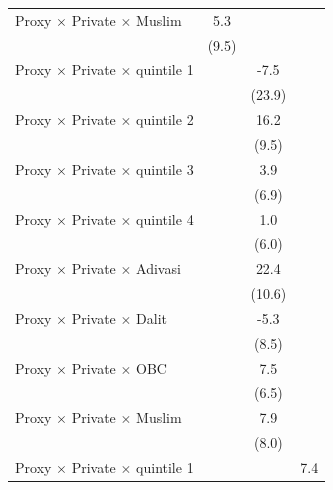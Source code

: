 {\begin{tabular}{l*{3}{c}}
Proxy $\times$ Private $\times$ Muslim&         5.3         &                     &                     \\
            &       (9.5)         &                     &                     \\
\addlinespace
Proxy $\times$ Private $\times$ quintile 1&                     &        -7.5         &                     \\
            &                     &      (23.9)         &                     \\
\addlinespace
Proxy $\times$ Private $\times$ quintile 2&                     &        16.2\sym{*}  &                     \\
            &                     &       (9.5)         &                     \\
\addlinespace
Proxy $\times$ Private $\times$ quintile 3&                     &         3.9         &                     \\
            &                     &       (6.9)         &                     \\
\addlinespace
Proxy $\times$ Private $\times$ quintile 4&                     &         1.0         &                     \\
            &                     &       (6.0)         &                     \\
\addlinespace
Proxy $\times$ Private $\times$ Adivasi&                     &        22.4\sym{**} &                     \\
            &                     &      (10.6)         &                     \\
\addlinespace
Proxy $\times$ Private $\times$ Dalit&                     &        -5.3         &                     \\
            &                     &       (8.5)         &                     \\
\addlinespace
Proxy $\times$ Private $\times$ OBC&                     &         7.5         &                     \\
            &                     &       (6.5)         &                     \\
\addlinespace
Proxy $\times$ Private $\times$ Muslim&                     &         7.9         &                     \\
            &                     &       (8.0)         &                     \\
\addlinespace
Proxy $\times$ Private $\times$ quintile 1&                     &                     &         7.4         \\

\end{tabular}}
